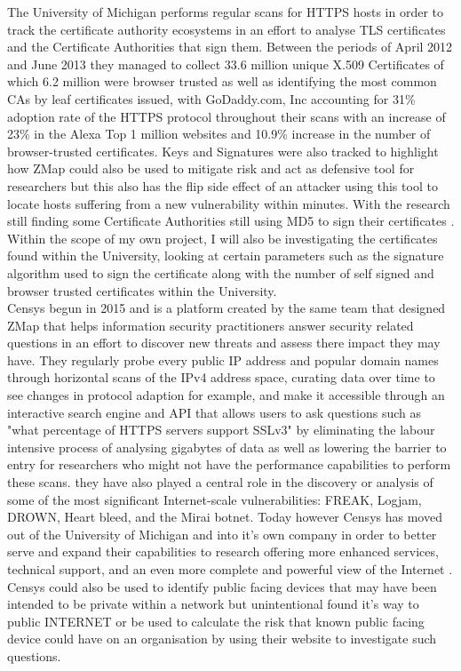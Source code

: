 \documentclass[a4wide,leqno,12pt]{report}
\begin{document}
The University of Michigan performs regular scans for HTTPS hosts\cite{durumeric2014internet} in order to track the certificate authority ecosystems in an effort to analyse TLS certificates and the Certificate Authorities that sign them. Between the periods of April 2012 and June 2013 they managed to collect 33.6 million unique X.509 Certificates of which 6.2 million were browser trusted as well as identifying the most common CAs by leaf certificates issued, with GoDaddy.com, Inc accounting for 31\% adoption rate of the HTTPS protocol throughout their scans with an increase of 23\% in the Alexa Top 1 million websites and  10.9\% increase in the number of browser-trusted certificates. Keys and Signatures were also tracked to highlight how ZMap could also be used to mitigate risk and act as defensive tool for researchers but this also has the flip side effect of an attacker using this tool to locate hosts suffering from a new vulnerability within minutes.\cite{durumeric2013zmap}  With the research still finding some Certificate Authorities still using MD5 to sign their certificates \cite{durumeric2013analysis}. Within the scope of my own project, I will also be investigating the certificates found within the University, looking at certain parameters such as the signature algorithm used to sign the certificate along with the number of self signed and browser trusted certificates within the University.  \\


Censys begun in 2015 and is a platform created by the same team that designed ZMap that helps information security practitioners answer security related questions in an effort to discover new threats and assess there impact they may have. They regularly probe every public IP address and popular domain names through horizontal scans of the IPv4 address space, curating data over time to see changes in protocol adaption for example, and make it accessible through an interactive search engine and API that allows users to ask questions such as "what percentage of HTTPS servers support SSLv3" by eliminating the labour intensive process of analysing gigabytes of data as well as lowering the barrier to entry for researchers who might not have the performance capabilities to perform these scans.\cite{durumeric2015search} they have also played a central role in the discovery or analysis of some of the most significant Internet-scale vulnerabilities: FREAK, Logjam, DROWN, Heart bleed, and the Mirai botnet. Today however Censys has moved out of the University of Michigan and into it's own company in order to better serve and expand their capabilities to research offering more enhanced services, technical support, and an even more complete and powerful view of the Internet \cite{censysWeb}.
Censys could also be used to identify public facing devices that may have been intended to be private within a network but unintentional found it's way to public INTERNET or be used to calculate the risk that known public facing device could have on an organisation \cite{durumeric2015search} by using their website to investigate such questions.\\
\end{document}
